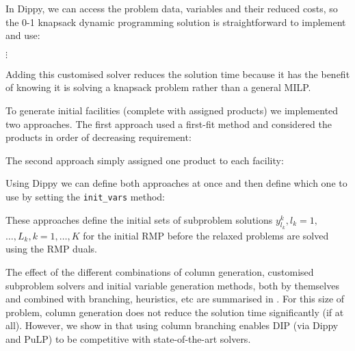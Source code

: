 In Dippy, we can access the problem data, variables and their reduced costs, so the 0-1 knapsack dynamic programming solution is straightforward to implement and use:

$\vdots$\newpage


Adding this customised solver reduces the solution time because it has the benefit of knowing it is solving a knapsack problem rather than a general \ac{MILP}.

To generate initial facilities (complete with assigned products) we implemented two approaches.
The first approach used a first-fit method and considered the products in order of decreasing requirement:

\newpage

The second approach simply assigned one product to each facility:


Using Dippy we can define both approaches at once and then define which one to use by setting the \lstinline{init_vars} method:


These approaches define the initial sets of subproblem solutions $y^k_{l_k}, l_k=1,$ $\ldots, L_k, k = 1, \ldots, K$ for the initial RMP before the relaxed problems are solved using the RMP duals.

The effect of the different combinations of column generation, customised subproblem solvers and initial variable generation methods, both by themselves and combined with branching, heuristics, etc are summarised in . For this size of problem, column generation does not reduce the solution time significantly (if at all). However, we show in  that using column branching enables \ac{DIP} (via Dippy and PuLP) to be competitive with state-of-the-art solvers.